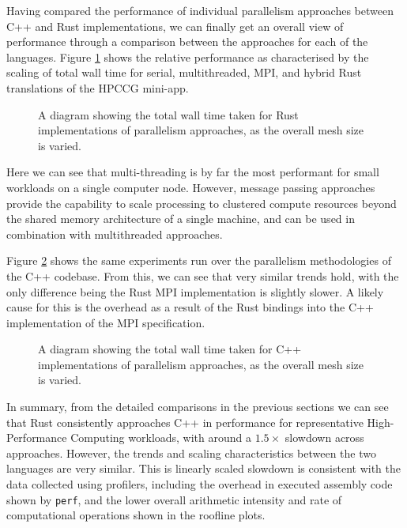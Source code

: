 Having compared the performance of individual parallelism approaches between C++ and Rust implementations, we can finally get an overall view of performance through a comparison between the approaches for each of the languages. Figure \ref{fig:translation_parallelism_rust} shows the relative performance as characterised by the scaling of total wall time for serial, multithreaded, MPI, and hybrid Rust translations of the HPCCG mini-app.

\begin{figure}[H]
    \centering
    
    \caption{A diagram showing the total wall time taken for Rust implementations of parallelism approaches, as the overall mesh size is varied.}
    \label{fig:translation_parallelism_rust}
\end{figure}

Here we can see that multi-threading is by far the most performant for small workloads on a single computer node. However, message passing approaches provide the capability to scale processing to clustered compute resources beyond the shared memory architecture of a single machine, and can be used in combination with multithreaded approaches.

Figure \ref{fig:translation_parallelism_cpp} shows the same experiments run over the parallelism methodologies of the C++ codebase. From this, we can see that very similar trends hold, with the only difference being the Rust MPI implementation is slightly slower. A likely cause for this is the overhead as a result of the Rust bindings into the C++ implementation of the MPI specification.

\begin{figure}[H]
    \centering
    
    \caption{A diagram showing the total wall time taken for C++ implementations of parallelism approaches, as the overall mesh size is varied.}
    \label{fig:translation_parallelism_cpp}
\end{figure}

In summary, from the detailed comparisons in the previous sections we can see that Rust consistently approaches C++ in performance for representative High-Performance Computing workloads, with around a $1.5 \times$ slowdown across approaches. However, the trends and scaling characteristics between the two languages are very similar. This is linearly scaled slowdown is consistent with the data collected using profilers, including the overhead in executed assembly code shown by \texttt{perf}, and the lower overall arithmetic intensity and rate of computational operations shown in the roofline plots.
